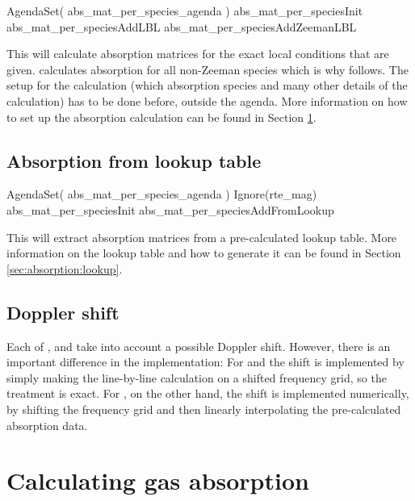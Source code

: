 \begin{code}
AgendaSet( abs_mat_per_species_agenda )
{
 abs_mat_per_speciesInit
 abs_mat_per_speciesAddLBL
 abs_mat_per_speciesAddZeemanLBL
}
\end{code}

This will calculate absorption matrices for the exact local
conditions that are given.   calculates
absorption for all non-Zeeman species which is why 
follows.
The setup for the calculation (which
absorption species and many other details of the calculation) has to
be done before, outside the agenda.  More information on how to set up
the absorption calculation can be found in Section
\ref{sec:absorption:calculating}.  

\subsection{Absorption from lookup table}

\begin{code}
AgendaSet( abs_mat_per_species_agenda )
{
 Ignore(rte_mag)
 abs_mat_per_speciesInit
 abs_mat_per_speciesAddFromLookup
}
\end{code}

This will extract absorption matrices from a pre-calculated lookup
table.  More information on the lookup table and how to generate it
can be found in Section \ref{sec:absorption:lookup}.  

\subsection{Doppler shift}
\label{sec:absorption:doppler}

Each of , 
 and
 take into account a
possible Doppler shift. However, there is an important difference in
the implementation: For  and  the shift
is implemented by simply making the line-by-line calculation on a
shifted frequency grid, so the treatment is exact. For
, on the other hand, the
shift is implemented numerically, by shifting the frequency grid and
then linearly interpolating the pre-calculated absorption data.


\section{Calculating gas absorption}
\label{sec:absorption:calculating}

